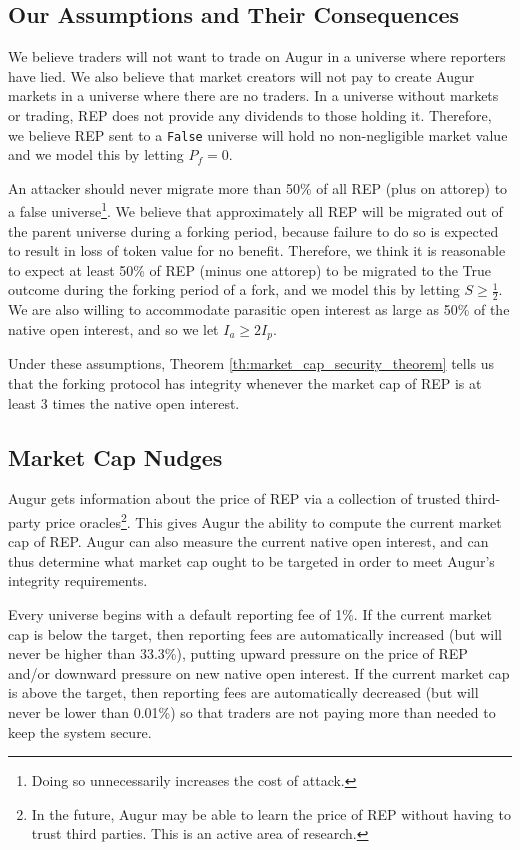 \documentclass[floatfix,reprint,nofootinbib,amsmath,amssymb,epsfig,pre,floats,letterpaper,groupedaffiliation]{revtex4-1}
\theoremstyle{definition}
\theoremstyle{definition}
\begin{document}
\subsection{Our Assumptions and Their Consequences}

We believe traders will not want to trade on Augur in a universe where reporters have lied.  We also believe that market creators will not pay to create Augur markets in a universe where there are no traders.  In a universe without markets or trading, REP does not provide any dividends to those holding it.  Therefore, we believe REP sent to a \texttt{False} universe will hold no non-negligible market value and we model this by letting $P_f = 0$.

An attacker should never migrate more than 50\% of all REP (plus on attorep) to a false universe\footnote{Doing so unnecessarily increases the cost of attack.}. We believe that approximately all REP will be migrated out of the parent universe during a forking period, because failure to do so is expected to result in loss of token value for no benefit. Therefore, we think it is reasonable to expect at least 50\% of REP (minus one attorep) to be migrated to the True outcome during the forking period of a fork, and we model this by letting $S \geq \frac{1}{2}$.  We are also willing to accommodate parasitic open interest as large as 50\% of the native open interest, and so we let $I_a \geq 2 I_p$.

Under these assumptions, Theorem \ref{th:market_cap_security_theorem} tells us that the forking protocol has integrity whenever the market cap of REP is at least 3 times the native open interest.

\subsection{Market Cap Nudges}\label{section:market_cap_nudges}

Augur gets information about the price of REP via a collection of trusted third-party price oracles\footnote{In the future, Augur may be able to learn the price of REP without having to trust third parties. This is an active area of research.}.  This gives Augur the ability to compute the current market cap of REP.  Augur can also measure the current native open interest, and can thus determine what market cap ought to be targeted in order to meet Augur's integrity requirements.

Every universe begins with a default reporting fee of 1\%. If the current market cap is below the target, then reporting fees are automatically increased (but will never be higher than 33.3\%), putting upward pressure on the price of REP and/or downward pressure on new native open interest.  If the current market cap is above the target, then reporting fees are automatically decreased (but will never be lower than 0.01\%) so that traders are not paying more than needed to keep the system secure.
\end{document}
